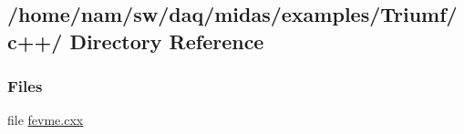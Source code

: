 \subsection{/home/nam/sw/daq/midas/examples/Triumf/c++/ Directory Reference}
\label{dir_8c48f48a5cef5f9afc5166fa280a4bf2}
\subsubsection*{Files}
\begin{DoxyCompactItemize}
\item 
file \hyperlink{fevme_8cxx}{fevme.cxx}
\end{DoxyCompactItemize}
